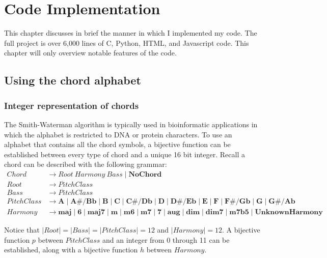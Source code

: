 \chapter{Code Implementation}

This chapter discusses in brief the manner in which I implemented my code. The full project is over 6,000 lines of C, Python, HTML, and Javascript code. This chapter will only overview notable features of the code.

\section{Using the chord alphabet}

\subsection{Integer representation of chords} \label{intrep}

The Smith-Waterman algorithm is typically used in bioinformatic applications in which the alphabet is restricted to DNA or protein characters. To use an alphabet that contains all the chord symbols, a bijective function can be established between every type of chord and a unique 16 bit integer. Recall a chord can be described with the following grammar:
\begin{align*}
Chord &\to Root\ Harmony \ Bass \mid \textbf{NoChord} \\
Root &\to PitchClass \\
Bass &\to PitchClass \\
PitchClass &\to \textbf{A} \mid \textbf{A#/Bb} \mid \textbf{B} \mid \textbf{C} \mid \textbf{C#/Db} \mid \textbf{D} \mid \textbf{D#/Eb} \mid \textbf{E} \mid \textbf{F} \mid \textbf{F#/Gb} \mid \textbf{G} \mid \textbf{G#/Ab} \\
Harmony &\to \textbf{maj} \mid \textbf{6} \mid \textbf{maj7} \mid \textbf{m} \mid \textbf{m6} \mid \textbf{m7} \mid \textbf{7} \mid \textbf{aug} \mid \textbf{dim} \mid \textbf{dim7} \mid \textbf{m7b5} \mid \textbf{UnknownHarmony}
\end{align*}

Notice that $|Root| = |Bass| = |PitchClass| = 12$ and $|Harmony| = 12$. A bijective function $p$ between $PitchClass$ and an integer from 0 through 11 can be established, along with a bijective function $h$ between $Harmony$.

